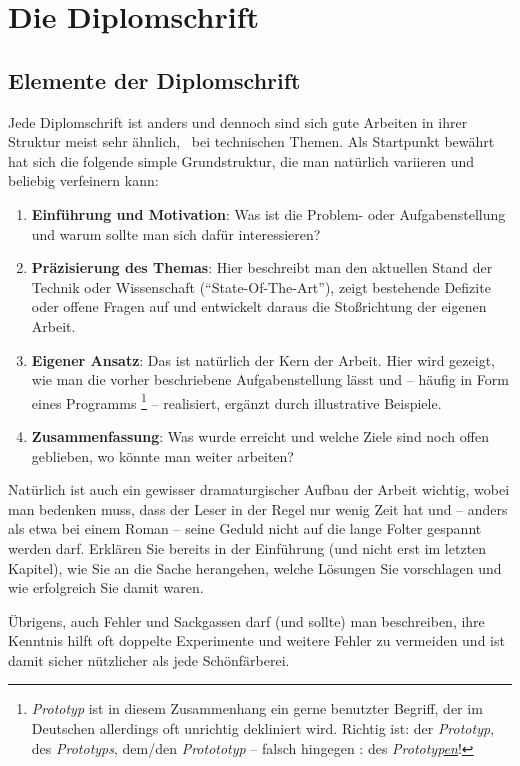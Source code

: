\chapter{Die Diplomschrift}
\label{cha:Diplomschrift}



\section{Elemente der Diplomschrift}

Jede Diplomschrift ist anders und dennoch sind sich gute
Arbeiten in ihrer Struktur meist sehr ähnlich, \va\ bei
technischen Themen. Als Startpunkt bewährt hat sich die folgende
simple Grundstruktur, die man natürlich vari\-ieren und beliebig
verfeinern kann:
%
\begin{enumerate}
\item \textbf{Einführung und Motivation}: Was ist die Problem- oder Aufgabenstellung und
warum sollte man sich dafür interessieren?
\item \textbf{Präzisierung des Themas}: Hier beschreibt man den aktuellen Stand der Technik
oder Wissenschaft ("`State-Of-The-Art"'), zeigt bestehende
Defizite oder offene Fragen auf und entwickelt daraus die
Stoßrichtung der eigenen Arbeit.
\item \textbf{Eigener Ansatz}: Das ist natürlich der Kern der Arbeit. Hier
wird gezeigt, wie man die vorher beschriebene Aufgabenstellung lässt und --
häufig in Form eines Programms%
\footnote{\emph{Prototyp} ist in diesem Zusammenhang ein gerne benutzter Begriff, der im Deutschen
allerdings oft unrichtig dekliniert wird. Richtig ist: der \emph{Prototyp}, des \emph{Prototyps}, dem/den \emph{Protototyp} -- falsch hingegen \zB: des \emph{Prototyp\underline{en}}!
} --
realisiert, ergänzt durch illustrative Beispiele.
\item \textbf{Zusammenfassung}: Was wurde erreicht und welche Ziele sind
noch offen geblieben, wo könnte man weiter arbeiten?
\end{enumerate}
%
Natürlich ist auch ein gewisser dramaturgischer Aufbau der Arbeit
wichtig, wobei man bedenken muss, dass der Leser in der Regel nur
wenig Zeit hat und -- anders als etwa bei einem Roman -- seine
Geduld nicht auf die lange Folter gespannt werden darf. Erklären
Sie bereits in der Einführung (und nicht erst im letzten Kapitel),
wie Sie an die Sache herangehen, welche Lösungen Sie vorschlagen
und wie erfolgreich Sie damit waren.

Übrigens, auch Fehler und Sackgassen darf (und sollte) man
beschreiben, ihre Kenntnis hilft oft doppelte Experimente und
weitere Fehler zu vermeiden und ist damit sicher nützlicher als
jede Schönfärberei.


